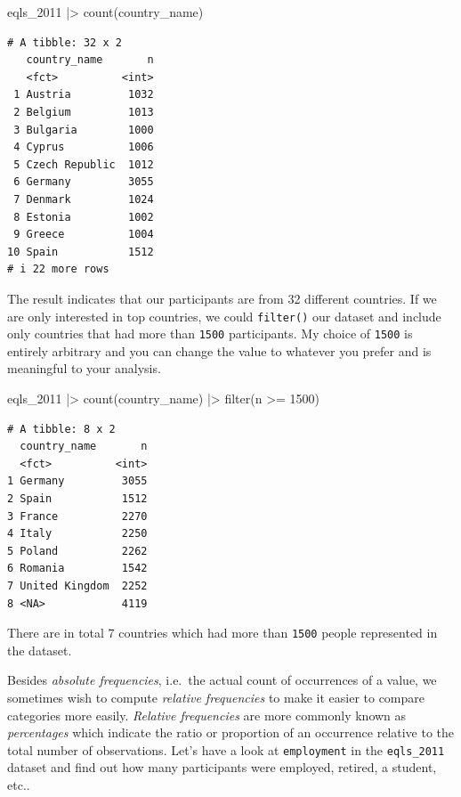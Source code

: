 \documentclass[
  letterpaper,
  DIV=11,
  numbers=noendperiod]{scrreprt}
\newenvironment{Shaded}{\begin{snugshade}}{\end{snugshade}}
\newcommand{\DecValTok}[1]{\textcolor[rgb]{0.68,0.00,0.00}{#1}}
\newcommand{\FunctionTok}[1]{\textcolor[rgb]{0.28,0.35,0.67}{#1}}
\newcommand{\NormalTok}[1]{\textcolor[rgb]{0.00,0.23,0.31}{#1}}
\newcommand{\SpecialCharTok}[1]{\textcolor[rgb]{0.37,0.37,0.37}{#1}}
\begin{document}
\begin{Shaded}
\begin{Highlighting}[]
\NormalTok{eqls\_2011 }\SpecialCharTok{|\textgreater{}} \FunctionTok{count}\NormalTok{(country\_name)}
\end{Highlighting}
\end{Shaded}

\begin{verbatim}
# A tibble: 32 x 2
   country_name       n
   <fct>          <int>
 1 Austria         1032
 2 Belgium         1013
 3 Bulgaria        1000
 4 Cyprus          1006
 5 Czech Republic  1012
 6 Germany         3055
 7 Denmark         1024
 8 Estonia         1002
 9 Greece          1004
10 Spain           1512
# i 22 more rows
\end{verbatim}

The result indicates that our participants are from 32 different
countries. If we are only interested in top countries, we could
\texttt{filter()} our dataset and include only countries that had more
than \texttt{1500} participants. My choice of \texttt{1500} is entirely
arbitrary and you can change the value to whatever you prefer and is
meaningful to your analysis.

\begin{Shaded}
\begin{Highlighting}[]
\NormalTok{eqls\_2011 }\SpecialCharTok{|\textgreater{}}
  \FunctionTok{count}\NormalTok{(country\_name) }\SpecialCharTok{|\textgreater{}}
  \FunctionTok{filter}\NormalTok{(n }\SpecialCharTok{\textgreater{}=} \DecValTok{1500}\NormalTok{)}
\end{Highlighting}
\end{Shaded}

\begin{verbatim}
# A tibble: 8 x 2
  country_name       n
  <fct>          <int>
1 Germany         3055
2 Spain           1512
3 France          2270
4 Italy           2250
5 Poland          2262
6 Romania         1542
7 United Kingdom  2252
8 <NA>            4119
\end{verbatim}

There are in total 7 countries which had more than \texttt{1500} people
represented in the dataset.

Besides \emph{absolute frequencies}, i.e.~the actual count of
occurrences of a value, we sometimes wish to compute \emph{relative
frequencies} to make it easier to compare categories more easily.
\emph{Relative frequencies} are more commonly known as
\emph{percentages} which indicate the ratio or proportion of an
occurrence relative to the total number of observations. Let's have a
look at \texttt{employment} in the \texttt{eqls\_2011} dataset and find
out how many participants were employed, retired, a student, etc..
\end{document}
